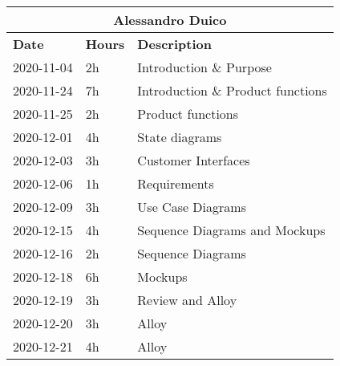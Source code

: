 \begin{table}[H]
    \centering
    \begin{tabular}{|l|l|l|}
        \multicolumn{3}{c}{\textbf{Alessandro Duico}}                      \\
        \hline
        \textbf{Date} & \textbf{Hours} & \textbf{Description}              \\\hline
        2020-11-04    & 2h             & Introduction \& Purpose           \\\hline
        2020-11-24    & 7h             & Introduction \& Product functions \\\hline
        2020-11-25    & 2h             & Product functions                 \\\hline
        2020-12-01    & 4h             & State diagrams                    \\\hline
        2020-12-03    & 3h             & Customer Interfaces               \\\hline
        2020-12-06    & 1h             & Requirements                      \\\hline
        2020-12-09    & 3h             & Use Case Diagrams                 \\\hline
        2020-12-15    & 4h             & Sequence Diagrams and Mockups     \\\hline
        2020-12-16    & 2h             & Sequence Diagrams                 \\\hline
        2020-12-18    & 6h             & Mockups                           \\\hline
        2020-12-19    & 3h             & Review and Alloy                  \\\hline
        2020-12-20    & 3h             & Alloy                             \\\hline
        2020-12-21    & 4h             & Alloy                             \\\hline 
    \end{tabular}
\end{table}